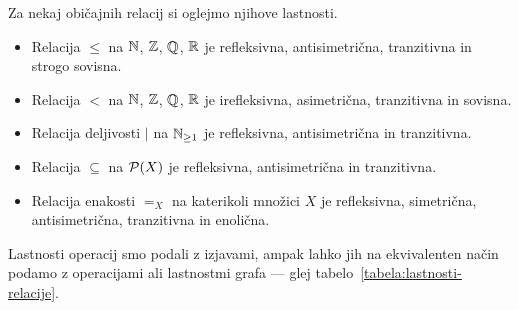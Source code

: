                 \begin{zgled}
                        Za nekaj običajnih relacij si oglejmo njihove lastnosti.
                        \begin{itemize}
                                \item
                                        Relacija $\leq$ na $\mathbb{N}$, $\mathbb{Z}$, $\mathbb{Q}$, $\mathbb{R}$ je refleksivna, antisimetrična, tranzitivna in strogo sovisna.
                                \item
                                        Relacija $<$ na $\mathbb{N}$, $\mathbb{Z}$, $\mathbb{Q}$, $\mathbb{R}$ je irefleksivna, asimetrična, tranzitivna in sovisna.
                                \item
                                        Relacija deljivosti $|$ na $\mathbb{N}_{\geq 1}$ je refleksivna, antisimetrična in tranzitivna.
                                \item
                                        Relacija $\subseteq$ na $\mathcal{P}(X)$ je refleksivna, antisimetrična in tranzitivna.
                                \item
                                        Relacija enakosti $=_X$ na katerikoli množici $X$ je refleksivna, simetrična, antisimetrična, tranzitivna in enolična.
                        \end{itemize}
                \end{zgled}

                Lastnosti operacij smo podali z izjavami, ampak lahko jih na ekvivalenten način podamo z operacijami ali lastnostmi grafa --- glej tabelo~\ref{tabela:lastnosti-relacije}.


